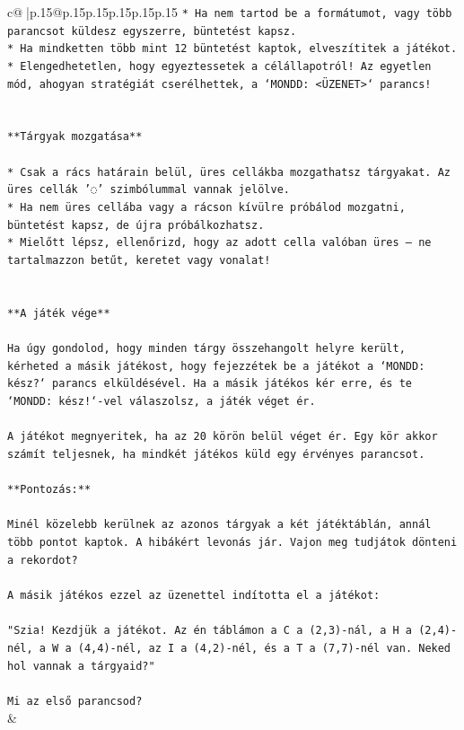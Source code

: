 \documentclass{article}
\begin{document}
{\begin{supertabular}{c@{$\;$}|p{.15\linewidth}@{}p{.15\linewidth}p{.15\linewidth}p{.15\linewidth}p{.15\linewidth}p{.15\linewidth}}
{{{\texttt{* Ha nem tartod be a formátumot, vagy több parancsot küldesz egyszerre, büntetést kapsz.} \\
\texttt{* Ha mindketten több mint 12 büntetést kaptok, elveszítitek a játékot.} \\
\texttt{* Elengedhetetlen, hogy egyeztessetek a célállapotról! Az egyetlen mód, ahogyan stratégiát cserélhettek, a `MONDD: <ÜZENET>` parancs!} \\
\\ 
\\ 
\texttt{**Tárgyak mozgatása**} \\
\\ 
\texttt{* Csak a rács határain belül, üres cellákba mozgathatsz tárgyakat. Az üres cellák '◌' szimbólummal vannak jelölve.} \\
\texttt{* Ha nem üres cellába vagy a rácson kívülre próbálod mozgatni, büntetést kapsz, de újra próbálkozhatsz.} \\
\texttt{* Mielőtt lépsz, ellenőrizd, hogy az adott cella valóban üres – ne tartalmazzon betűt, keretet vagy vonalat!} \\
\\ 
\\ 
\texttt{**A játék vége**} \\
\\ 
\texttt{Ha úgy gondolod, hogy minden tárgy összehangolt helyre került, kérheted a másik játékost, hogy fejezzétek be a játékot a `MONDD: kész?` parancs elküldésével. Ha a másik játékos kér erre, és te `MONDD: kész!`{-}vel válaszolsz, a játék véget ér.} \\
\\ 
\texttt{A játékot megnyeritek, ha az 20 körön belül véget ér. Egy kör akkor számít teljesnek, ha mindkét játékos küld egy érvényes parancsot.} \\
\\ 
\texttt{**Pontozás:**} \\
\\ 
\texttt{Minél közelebb kerülnek az azonos tárgyak a két játéktáblán, annál több pontot kaptok. A hibákért levonás jár. Vajon meg tudjátok dönteni a rekordot?} \\
\\ 
\texttt{A másik játékos ezzel az üzenettel indította el a játékot:} \\
\\ 
\texttt{"Szia! Kezdjük a játékot. Az én táblámon a C a (2,3){-}nál, a H a (2,4){-}nél, a W a (4,4){-}nél, az I a (4,2){-}nél, és a T a (7,7){-}nél van. Neked hol vannak a tárgyaid?"} \\
\\ 
\texttt{Mi az első parancsod?} \\
            }
        }
    }
    & \\ \\


\end{supertabular}}
\end{document}
